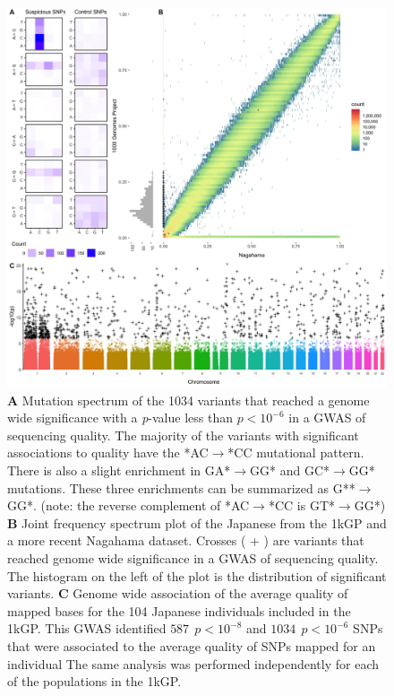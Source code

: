 \documentclass[9pt,lineno]{elife}
\begin{document}
\begin{figure}
\includegraphics[width=\hsize,keepaspectratio]{./Figures/Figure1.jpg}
\caption{
\textbf{A} 
Mutation spectrum of the 1034 variants that reached a genome wide significance with a \textit{p}-value less than $p < 10^{-6}$  in a GWAS of sequencing quality. 
The majority of the variants with significant associations to quality have the *AC${\rightarrow}$*CC mutational pattern. There is also a slight enrichment in GA*${\rightarrow}$GG* and GC*${\rightarrow}$GG* mutations. These three enrichments can be summarized as G**${\rightarrow}$GG*. (note: the reverse complement of *AC${\rightarrow}$*CC is GT*${\rightarrow}$GG*)
\textbf{B} 
Joint frequency spectrum plot of the Japanese from the 1kGP and a more recent Nagahama dataset.
Crosses ( + ) are variants that reached genome wide significance in a GWAS of sequencing quality. 
The histogram on the left of the plot is the distribution of significant variants. 
\textbf{C} 
Genome wide association of the average quality of mapped bases for the 104 Japanese individuals included in the 1kGP. This GWAS identified $587\ \  p < 10^{-8}$ and $1034\ \ p < 10^{-6}$ SNPs that were associated to the average quality of SNPs mapped for an individual
The same analysis was performed independently for each of the populations in the 1kGP. }
 \label{SFS}
\end{figure}
\end{document}
